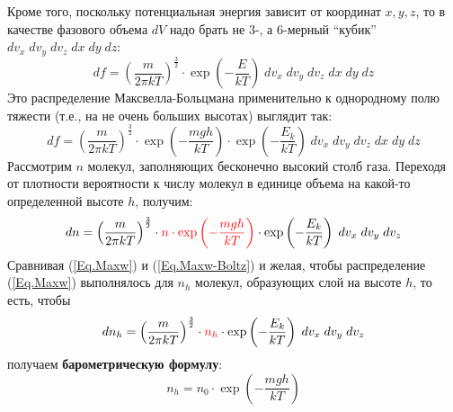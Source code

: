 \documentclass[12pt,epsfig,color,russian]{article}
\begin{document}
Кроме того, поскольку потенциальная энергия зависит от координат $x,y,z$, то в качестве фазового объема $dV$ надо брать не 3-, а 6-мерный ``кубик'' $dv_x\;dv_y\;dv_z\;dx\;dy\;dz$:
\begin{equation}
df= \left(\frac{m}{2\pi kT}\right)^\frac32 \cdot \exp\left(-\frac{E}{kT}\right)\;dv_x\;dv_y\;dv_z\;dx\;dy\;dz
\end{equation}
Это распределение Максвелла-Больцмана применительно к однородному полю тяжести (т.е., на не очень больших высотах) выглядит так:
\begin{displaymath}
df= \left(\frac{m}{2\pi kT}\right)^\frac32 \cdot \exp\left(-\frac{mgh}{kT}\right)\cdot \exp\left(-\frac{E_k}{kT}\right)\;dv_x\;dv_y\;dv_z\;dx\;dy\;dz
\end{displaymath}
Рассмотрим $n$ молекул, заполняющих бесконечно высокий столб газа.
Переходя от плотности вероятности к числу молекул в единице объема на какой-то определенной высоте $h$, получим:
\begin{equation}\label{Eq.Maxw-Boltz}
dn= \left(\frac{m}{2\pi kT}\right)^\frac32\cdot {\color{red} n \cdot \exp\left(-\frac{mgh}{kT}\right)}\cdot \exp\left(-\frac{E_k}{kT}\right)\;dv_x\;dv_y\;dv_z
\end{equation}
Сравнивая (\ref{Eq.Maxw}) и (\ref{Eq.Maxw-Boltz}) и желая, чтобы распределение (\ref{Eq.Maxw}) выполнялось для $n_h$ молекул, образующих слой на высоте $h$, то есть, чтобы
\begin{displaymath}
dn_h= \left(\frac{m}{2\pi kT}\right)^\frac32\cdot {\color{red} n_h} \cdot \exp\left(-\frac{E_k}{kT}\right)\;dv_x\;dv_y\;dv_z
\end{displaymath}
получаем {\bf \color{red} барометрическую формулу}:
\begin{equation}
n_h=n_0\cdot\exp\left(-\frac{mgh}{kT}\right)
\end{equation}
\end{document}
